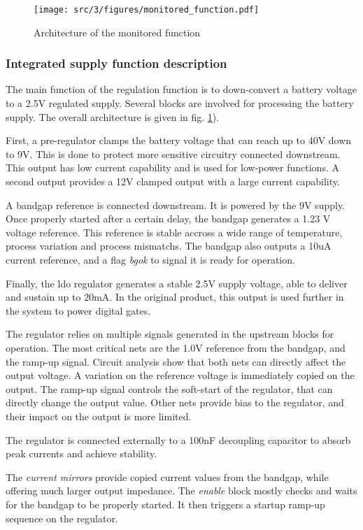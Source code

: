 \begin{figure}[!htbp]
  \centering
  \texttt{[image: src/3/figures/monitored\_function.pdf]}
  \caption{Architecture of the monitored function}
  \label{fig:monitored_function}
\end{figure}


\subsubsection{Integrated supply function description}

The main function of the regulation function is to down-convert a battery voltage to a 2.5V regulated supply.
Several blocks are involved for processing the battery supply.
The overall architecture is given in fig. \ref{fig:monitored_function}).

First, a pre-regulator clamps the battery voltage that can reach up to 40V down to 9V.
This is done to protect more sensitive circuitry connected downstream.
This output has low current capability and is used for low-power functions.
A second output provides a 12V clamped output with a large current capability.

A bandgap reference is connected downstream.
It is powered by the 9V supply.
Once properly started after a certain delay, the bandgap generates a 1.23 V voltage reference.
This reference is stable accross a wide range of temperature, process variation and process mismatchs.
The bandgap also outputs a 10uA current reference, and a flag \textit{bgok} to signal it is ready for operation.

Finally, the \gls{ldo} regulator generates a stable 2.5V supply voltage, able to deliver and sustain up to 20mA.
In the original product, this output is used further in the system to power digital gates.

The regulator relies on multiple signals generated in the upstream blocks for operation.
The most critical nets are the 1.0V reference from the bandgap, and the ramp-up signal.
Circuit analysis show that both nets can directly affect the output voltage.
A variation on the reference voltage is immediately copied on the output.
The ramp-up signal controls the soft-start of the regulator, that can directly change the output value.
Other nets provide bias to the regulator, and their impact on the output is more limited.

The regulator is connected externally to a 100nF decoupling capacitor to absorb peak currents and achieve stability.

The \textit{current mirrors} provide copied current values from the bandgap, while offering much larger output impedance.
The \textit{enable} block mostly checks and waits for the bandgap to be properly started.
It then triggers a startup ramp-up sequence on the regulator.
